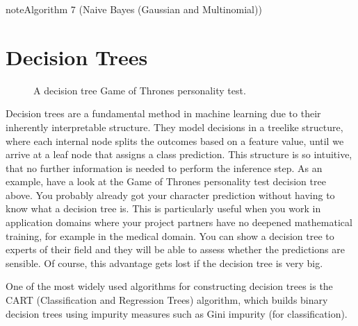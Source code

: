 \documentclass[letterpaper,10pt,english]{jupyterBook}
\let\sphinxpxdimen\pdfpxdimen\else\newdimen\sphinxpxdimen
\begin{document}
\begin{sphinxadmonition}{note}{Algorithm 7 (Naive Bayes (Gaussian and Multinomial))}
\begin{enumerate}
\begin{enumerate}
\begin{enumerate}
\begin{enumerate}
\end{enumerate}

\end{enumerate}

\end{enumerate}

\end{enumerate}
\end{sphinxadmonition}

\sphinxstepscope


\section{Decision Trees}
\label{\detokenize{classification_decision_trees:decision-trees}}\label{\detokenize{classification_decision_trees::doc}}
\begin{figure}[htbp]
\centering
\capstart

\noindent\sphinxincludegraphics[height=500\sphinxpxdimen]{{GOT_DT}.png}
\caption{A decision tree Game of Thrones personality test.}\label{\detokenize{classification_decision_trees:got-decision-tree}}\end{figure}

\sphinxAtStartPar
Decision trees are a fundamental method in machine learning due to their inherently interpretable structure. They model decisions in a tree\sphinxhyphen{}like structure, where each internal node splits the outcomes based on a feature value, until we arrive at a leaf node that assigns a class prediction. This structure is so intuitive, that no further information is needed to perform the inference step. As an example, have a look at the Game of Thrones personality test decision tree above. You probably already got your character prediction without having to know what a decision tree is. This is particularly useful when you work in application domains where your project partners have no deepened mathematical training, for example in the medical domain. You can show a decision tree to experts of their field and they will be able to assess whether the predictions are sensible. Of course, this advantage gets lost if the decision tree is very big.

\sphinxAtStartPar
One of the most widely used algorithms for constructing decision trees is the CART (Classification and Regression Trees) algorithm, which builds binary decision trees using impurity measures such as Gini impurity (for classification).
\end{document}
